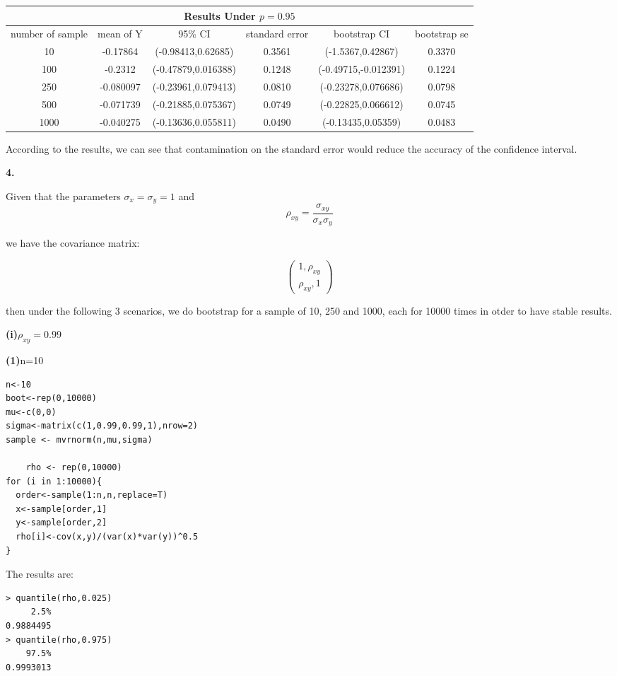 \documentclass[letterpaper,11pt]{article}
\begin{document}
\begin{center}
\begin{tabular}{ |c|c|c|c|c|c| }
 \hline
 \multicolumn{6}{|c|}{Results Under $p=0.95$} \\
 \hline
number of sample & mean of Y & 95\% CI & standard error & bootstrap CI & bootstrap se\\
 \hline
 10  & -0.17864    &(-0.98413,0.62685)&0.3561 &(-1.5367,0.42867)& 0.3370\\
 100  & -0.2312  &(-0.47879,0.016388)&0.1248 &(-0.49715,-0.012391)&0.1224\\
 250 &-0.080097 &(-0.23961,0.079413)& 0.0810&(-0.23278,0.076686)&0.0798\\
 500    & -0.071739 &(-0.21885,0.075367)&0.0749 &(-0.22825,0.066612)&0.0745\\
 1000 &-0.040275 &(-0.13636,0.055811)& 0.0490&(-0.13435,0.05359)&0.0483\\
 \hline
\end{tabular}
\end{center}


According to the results, we can see that contamination on the standard error would reduce the accuracy of the confidence interval.
\newpage

\begin{addmargin}[-2em]{0em} \large{\textbf{4. }}\end{addmargin}

Given that the parameters $\sigma_x=\sigma_y=1$ and 
$$\rho_{xy}=\frac{\sigma_{xy}}{\sigma_x\sigma_y}$$

we have the covariance matrix:

$$\begin{pmatrix}
1,\rho_{xy}\\
\rho_{xy},1
\end{pmatrix}$$

then under the following 3 scenarios, we do bootstrap for a sample of 10, 250 and 1000, each for 10000 times in otder to have stable results.
\bigbreak
\begin{addmargin}[-1.1em]{0em} \textbf{(i)}$\rho_{xy}=0.99$\par \end{addmargin}


\begin{addmargin}[0em]{0em} \textbf{(1)}n=10\par \end{addmargin}

\begin{lstlisting}
n<-10
boot<-rep(0,10000)
mu<-c(0,0)
sigma<-matrix(c(1,0.99,0.99,1),nrow=2)
sample <- mvrnorm(n,mu,sigma)

	rho <- rep(0,10000)
for (i in 1:10000){
  order<-sample(1:n,n,replace=T)
  x<-sample[order,1]
  y<-sample[order,2]
  rho[i]<-cov(x,y)/(var(x)*var(y))^0.5
}
\end{lstlisting}
The results are:
\begin{lstlisting}
> quantile(rho,0.025)
     2.5% 
0.9884495 
> quantile(rho,0.975)
    97.5% 
0.9993013 
\end{lstlisting}
\end{document}
